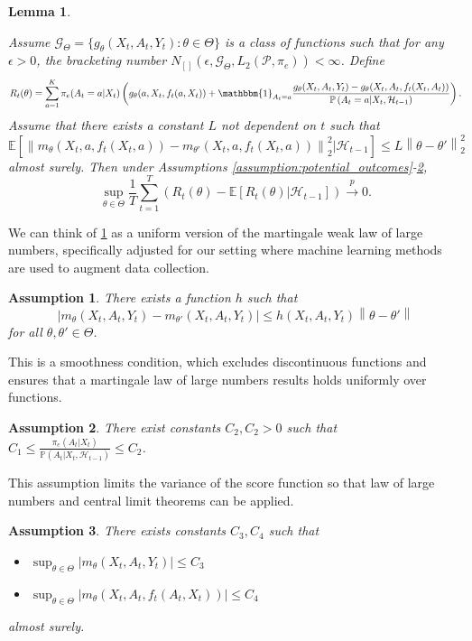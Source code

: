 \documentclass[11pt]{article}
\newcommand{\E}{\mathbb{E}}
\newcommand{\norm}[1]{\left\lVert#1\right\rVert}
\newtheorem{lemma}{Lemma}
\newtheorem{assumption}{Assumption}
\begin{document}
\begin{lemma} \label{lemma:uniform_lln}

Assume $\mathcal{G}_{\Theta}=\{ g_{\theta}(X_t,A_{t},Y_{t}) : \theta \in \Theta  \}$ is a class of functions such that for any $\epsilon >0$, the bracketing number  $N_{[]}(\epsilon, \mathcal{G}_{\Theta}, L_{2}(\mathcal{P},\pi_{e})) < \infty$. Define
\begin{equation} \label{eqn:r_t_theta}
R_{t}(\theta) =  \sum_{a=1}^{K} \pi_{e}(A_{t} =a | X_{t}) \left( g_{\theta}(a,X_{t},f_{t}(a,X_{t}))   + \mathbbm{1}_{A_{t} = a} \frac{ g_{\theta}(X_{t},A_{t},Y_{t})  -  g_{\theta}(X_{t},A_{t},f_{t}(X_{t},A_{t})) }{ \mathbb{P} \left(A_{t} =a | X_{t},\mathcal{H}_{t-1} \right)  }\right).
\end{equation}
Assume that there exists a constant $L$ not dependent on $t$ such that
$$\E\left[ \norm{m_{\theta}(X_{t},a,f_{t}(X_t,a)) - m_{\theta'}(X_{t},a,f_{t}(X_t,a))}^{2}_{2} |\mathcal{H}_{t-1} \right] \le L \norm{ \theta - \theta'}_{2}^{2}$$ almost surely.
Then under Assumptions \ref{assumption:potential_outcomes}-\ref{assumption:bounded_importance},
$$\sup_{\theta \in \Theta }\frac{1}{T} \sum_{t=1}^{T} \left(R_t(\theta) - \mathbb{E}[R_{t}(\theta) |\mathcal{H}_{t-1}]\right) \overset{p}{\to} 0.$$
\end{lemma}
We can think of \cref{lemma:uniform_lln} as a uniform version of the martingale weak law of large numbers, specifically adjusted for our setting where machine learning methods are used to augment data collection. 

\iffalse
\begin{assumption} \label{assumption:lipschitz}
There exists a function $h$ such that 
$$|m_{\theta}(X_{t},A_{t},Y_{t}) - m_{\theta'}(X_{t},A_{t},Y_{t})| \le h(X_{t},A_{t},Y_{t}) \norm{\theta - \theta'}$$
for all $\theta, \theta' \in \Theta$.
\end{assumption}
This is a smoothness condition, which excludes discontinuous functions and ensures that a martingale law of large numbers results holds uniformly over functions. 

\begin{assumption} \label{assumption:bounded_importance}
There exist constants $C_{2}, C_{2} > 0$ such that  $C_{1} \le \frac{\pi_{e}(A_{t} |X_{t}) }{ \mathbb{P} \left(A_{t}| X_{t}, \mathcal{H}_{t-1} \right) } \le C_{2}$. 
\end{assumption}
This assumption limits the variance of the score function so that law of large numbers and central limit theorems can be applied. 
\begin{assumption} \label{assumption:bounded_reward}
There exists constants $C_{3},C_{4}$ such that 
\begin{itemize}
    \item $\sup_{\theta \in \Theta} |m_{\theta}(X_{t},A_{t},Y_{t})| \le C_{3} $
    \item $\sup_{\theta \in \Theta} |m_{\theta}(X_{t},A_{t},f_{t}(A_t,X_t))| \le C_{4} $
\end{itemize}
almost surely. 
\end{assumption}
\end{document}
